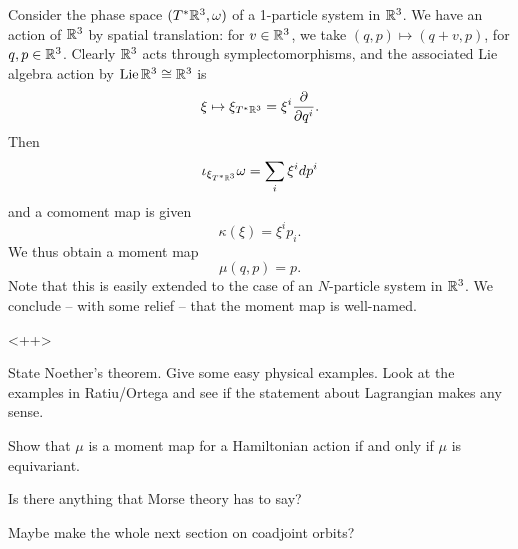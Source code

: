 \documentclass{amsart}
\begin{document}
\begin{example}
    Consider the phase space $(T^*\mathbb{R}^3,\omega)$ of a 1-particle system in $\mathbb{R}^3$. We have an action
    of $\mathbb{R}^3$ by spatial translation: for $v\in\mathbb{R}^3$, we take $(q,p)\mapsto (q+v,p)$, for $q,p\in\mathbb{R}^3$.
    Clearly $\mathbb{R}^3$ acts through symplectomorphisms, and the associated Lie algebra
    action by $\operatorname{Lie}\mathbb{R}^3\cong\mathbb{R}^3$ is
    \begin{equation*}
        \xi \mapsto \xi_{T^*\mathbb{R}^{3}}=\xi^i\frac{\partial}{\partial q^i}.
    \end{equation*}
    Then
    \begin{equation*}
        \iota_{\xi_{T^*\mathbb{R}^3}}\omega = \sum_i\xi^idp^i
    \end{equation*}
    and a comoment map is given
    \begin{equation*}
        \kappa(\xi) = \xi^i p_i.
    \end{equation*}
    We thus obtain a moment map
    \begin{equation*}
        \mu(q,p) = p.
    \end{equation*}
    Note that this is easily extended to the case of an $N$-particle system in $\mathbb{R}^3$.
    We conclude -- with some relief -- that the moment map is well-named.
\end{example}

\begin{example}
    
\end{example}<++>

State Noether's theorem. Give some easy physical examples. Look at the examples in Ratiu/Ortega
and see if the statement about Lagrangian makes any sense.

Show that $\mu$ is a moment map for a Hamiltonian action if and only if $\mu$ is equivariant.

Is there anything that Morse theory has to say?

Maybe make the whole next section on coadjoint orbits?
\end{document}
